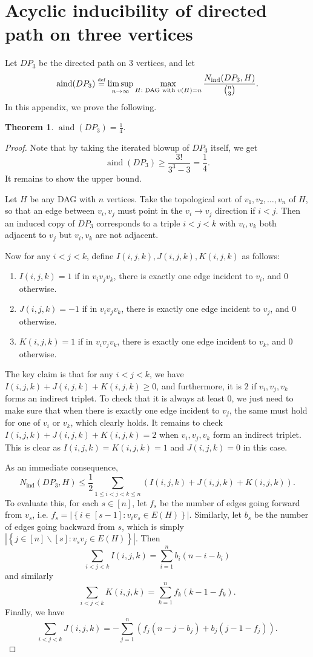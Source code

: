 \documentclass[reqno,11pt]{amsart}
\numberwithin{equation}{section}
\newtheorem{theorem}{Theorem}[section]
\theoremstyle{definition}
\theoremstyle{remark}
\newcommand{\abs}[1]{\left\lvert#1\right\rvert}
\DeclareMathOperator{\ind}{ind}
\DeclareMathOperator{\aind}{aind}
\newcommand*{\eqdef}{\stackrel{\mbox{\normalfont\tiny def}}{=}}
\begin{document}
\section{Acyclic inducibility of directed path on three vertices}\label{sec:aind-DP3}
Let $DP_3$ be the directed path on $3$ vertices, and let
\[\aind(DP_3) \eqdef \limsup_{n\to\infty}\max_{H:\textup{ DAG with }v(H)=n}\frac{N_{\ind}(DP_3,H)}{\binom{n}{3}}.\]
In this appendix, we prove the following.
\begin{theorem}\label{thm:aind-DP3}
    $\aind(DP_3) = \frac{1}{4}.$
\end{theorem}
\begin{proof}
    Note that by taking the iterated blowup of $DP_3$ itself, we get
    \[\aind(DP_3)\geq \frac{3!}{3^3-3}=\frac{1}{4}.\]
    It remains to show the upper bound.

    Let $H$ be any DAG with $n$ vertices. 
    Take the topological sort of $v_1,v_2,\ldots, v_n$ of $H$, so that an edge between $v_i,v_j$ must point in the $v_i\to v_j$ direction if $i<j$.
    Then an induced copy of $DP_3$ corresponds to a triple $i<j<k$ with $v_i,v_k$ both adjacent to $v_j$ but $v_i,v_k$ are not adjacent.

    Now for any $i<j<k$, define $I(i,j,k),J(i,j,k),K(i,j,k)$ as follows:
    \begin{enumerate}
        \item $I(i,j,k)=1$ if in $v_iv_jv_k$, there is exactly one edge incident to $v_i$, and $0$ otherwise.
        \item $J(i,j,k)=-1$ if in $v_iv_jv_k$, there is exactly one edge incident to $v_j$, and $0$ otherwise.
        \item $K(i,j,k)=1$ if in $v_iv_jv_k$, there is exactly one edge incident to $v_k$, and $0$ otherwise.
    \end{enumerate}
    The key claim is that for any $i<j<k$, we have $I(i,j,k)+J(i,j,k)+K(i,j,k)\geq 0$, and furthermore, it is $2$ if $v_i,v_j,v_k$ forms an indirect triplet.
    To check that it is always at least $0$, we just need to make sure that when there is exactly one edge incident to $v_j$, the same must hold for one of $v_i$ or $v_k$, which clearly holds.    
    It remains to check $I(i,j,k)+J(i,j,k)+K(i,j,k)=2$ when $v_i,v_j,v_k$ form an indirect triplet.
    This is clear as $I(i,j,k)=K(i,j,k)=1$ and $J(i,j,k)=0$ in this case.
    
    As an immediate consequence,
    \[N_{\ind}(DP_3,H)\leq \frac{1}{2}\sum_{1\leq i<j<k\leq n}\left(I(i,j,k)+J(i,j,k)+K(i,j,k)\right).\]
    To evaluate this, for each $s\in [n]$, let $f_s$ be the number of edges going forward from $v_s$, i.e. $f_s = \abs{\left\{i\in [s-1]: v_iv_s\in E(H)\right\}}$.
    Similarly, let $b_s$ be the number of edges going backward from $s$, which is simply $\abs{\left\{j\in [n]\backslash [s]: v_sv_j\in E(H)\right\}}$.
    Then 
    \[\sum_{i<j<k}I(i,j,k) = \sum_{i=1}^{n}b_i(n-i-b_i)\]
    and similarly
    \[\sum_{i<j<k}K(i,j,k) = \sum_{k=1}^{n}f_k(k-1-f_k).\]
    Finally, we have
    \[\sum_{i<j<k}J(i,j,k) = -\sum_{j=1}^{n}\left(f_j(n-j-b_j)+b_j(j-1-f_j)\right).\]
    

\end{proof}
\end{document}
